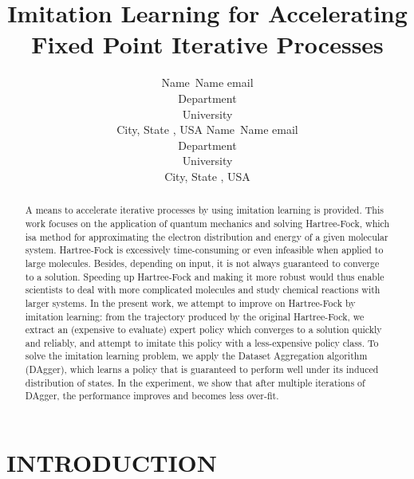 \documentclass[twoside,11pt]{article}
\begin{document}
\title{Imitation Learning for Accelerating Fixed Point Iterative Processes}

\author{\name Name\ Name \email email \\
       \addr Department\\
       University \\
       City, State , USA
       \AND
       \name Name\ Name \email email \\
       \addr Department\\
       University \\
       City, State , USA}

\maketitle


\begin{abstract}
A means to accelerate iterative processes by using imitation learning is provided. This work focuses on the application of quantum mechanics and solving Hartree-Fock, which isa method for approximating the electron distribution and energy of a given molecular system. Hartree-Fock is excessively time-consuming or even infeasible when applied to large molecules. Besides, depending on input, it is not always guaranteed to converge to a solution. Speeding up Hartree-Fock and making it more robust would thus enable scientists to deal with more complicated molecules and study chemical reactions with larger systems. In the present work, we attempt to improve on Hartree-Fock by imitation learning: from the trajectory produced by the original Hartree-Fock, we extract an (expensive to evaluate) expert policy which converges to a solution quickly and reliably, and attempt to imitate this policy with a less-expensive policy class.  To solve the imitation learning problem, we apply the Dataset Aggregation algorithm (DAgger), which learns a policy that is guaranteed to perform well under its induced distribution of states. In the experiment, we show that after 
 multiple iterations of DAgger, the performance improves and becomes less over-fit. 
\end{abstract}

\section{INTRODUCTION}
\end{document}
